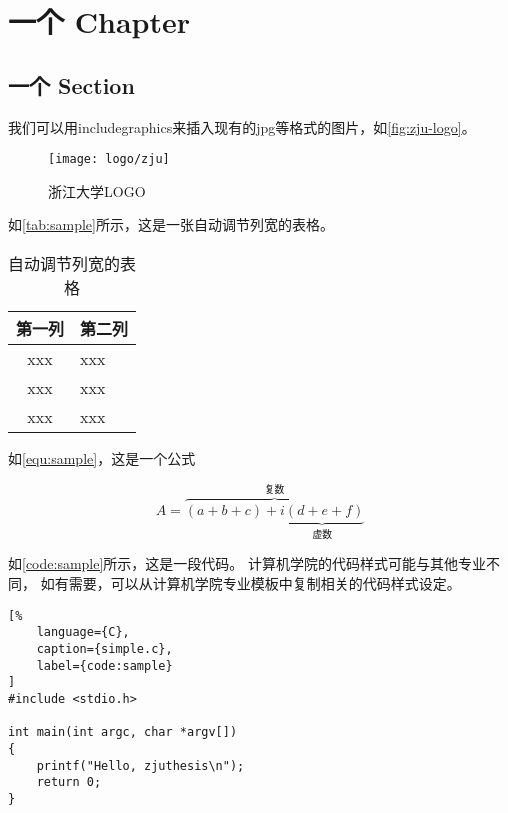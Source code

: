 \chapter{一个 Chapter}

\zhlipsum[1][name=zhufu]

\section{一个 Section}


\par 我们可以用includegraphics来插入现有的jpg等格式的图片，如\autoref{fig:zju-logo}。

\begin{figure}[ht]
    \centering
    \texttt{[image: logo/zju]}
    \caption{\label{fig:zju-logo}浙江大学LOGO}
\end{figure}

\par 如\autoref{tab:sample}所示，这是一张自动调节列宽的表格。

\begin{table}[ht]
    \caption{\label{tab:sample}自动调节列宽的表格}
    \begin{tabularx}{\linewidth}{|c|X<{\centering}|}
        \hline
        第一列 & 第二列 \\ \hline
        xxx & xxx \\ \hline
        xxx & xxx \\ \hline
        xxx & xxx \\ \hline
    \end{tabularx}
\end{table}

\par 如\autoref{equ:sample}，这是一个公式

\begin{equation}
    \label{equ:sample}
    A=\overbrace{(a+b+c)+\underbrace{i(d+e+f)}_{\text{虚数}}}^{\text{复数}}
\end{equation}

\par 如\autoref{code:sample}所示，这是一段代码。
计算机学院的代码样式可能与其他专业不同，
如有需要，可以从计算机学院专业模板中复制相关的代码样式设定。

\begin{lstlisting}[%
    language={C},
    caption={simple.c},
    label={code:sample}
]
#include <stdio.h>

int main(int argc, char *argv[])
{
    printf("Hello, zjuthesis\n");
    return 0;
}
\end{lstlisting}

